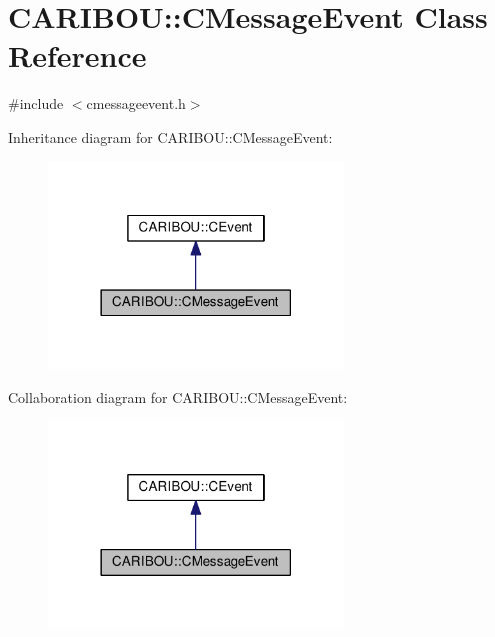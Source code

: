 \section{C\+A\+R\+I\+B\+OU\+:\+:C\+Message\+Event Class Reference}
\label{class_c_a_r_i_b_o_u_1_1_c_message_event}


{\ttfamily \#include $<$cmessageevent.\+h$>$}



Inheritance diagram for C\+A\+R\+I\+B\+OU\+:\+:C\+Message\+Event\+:
\nopagebreak
\begin{figure}[H]
\begin{center}
\leavevmode
\includegraphics[width=222pt]{class_c_a_r_i_b_o_u_1_1_c_message_event__inherit__graph}
\end{center}
\end{figure}


Collaboration diagram for C\+A\+R\+I\+B\+OU\+:\+:C\+Message\+Event\+:
\nopagebreak
\begin{figure}[H]
\begin{center}
\leavevmode
\includegraphics[width=222pt]{class_c_a_r_i_b_o_u_1_1_c_message_event__coll__graph}
\end{center}
\end{figure}

